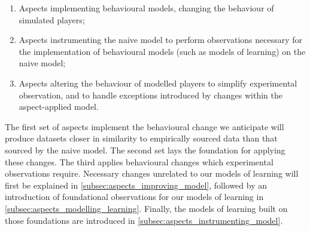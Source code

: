 \begin{enumerate}
  \item Aspects implementing behavioural models, changing the behaviour of
  simulated players;
  \item Aspects instrumenting the naive model to perform observations necessary
  for the implementation of behavioural models (such as models of learning) on
  the naive model;
  \item Aspects altering the behaviour of modelled players to simplify
  experimental observation, and to handle exceptions introduced by changes
  within the aspect-applied model.
\end{enumerate}

The first set of aspects implement the behavioural change we anticipate will
produce datasets closer in similarity to empirically sourced data than that
sourced by the naive model. The second set lays the foundation for applying
these changes. The third applies behavioural changes which experimental
observations require. Necessary changes unrelated to our models of learning will
first be explained in \cref{subsec:aspects_improving_model}, followed by an
introduction of foundational observations for our models of learning in
\cref{subsec:aspects_modelling_learning}. Finally, the models of learning built
on those foundations are introduced in
\cref{subsec:aspects_instrumenting_model}.


